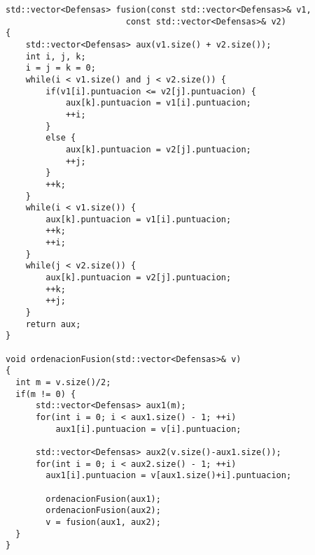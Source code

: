 \begin{lstlisting}
std::vector<Defensas> fusion(const std::vector<Defensas>& v1,
                        const std::vector<Defensas>& v2)
{
    std::vector<Defensas> aux(v1.size() + v2.size());
    int i, j, k;
    i = j = k = 0;
    while(i < v1.size() and j < v2.size()) {
        if(v1[i].puntuacion <= v2[j].puntuacion) {
            aux[k].puntuacion = v1[i].puntuacion;
            ++i;
        }
        else {
            aux[k].puntuacion = v2[j].puntuacion;
            ++j;
        }
        ++k;
    }
    while(i < v1.size()) {
        aux[k].puntuacion = v1[i].puntuacion;
        ++k;
        ++i;
    }
    while(j < v2.size()) {
        aux[k].puntuacion = v2[j].puntuacion;
        ++k;
        ++j;
    }
    return aux;
}

void ordenacionFusion(std::vector<Defensas>& v)
{
  int m = v.size()/2;
  if(m != 0) {
      std::vector<Defensas> aux1(m);
      for(int i = 0; i < aux1.size() - 1; ++i)
          aux1[i].puntuacion = v[i].puntuacion;

      std::vector<Defensas> aux2(v.size()-aux1.size());
      for(int i = 0; i < aux2.size() - 1; ++i)
        aux1[i].puntuacion = v[aux1.size()+i].puntuacion;

        ordenacionFusion(aux1);
        ordenacionFusion(aux2);
        v = fusion(aux1, aux2);
  }
}

\end{lstlisting}
